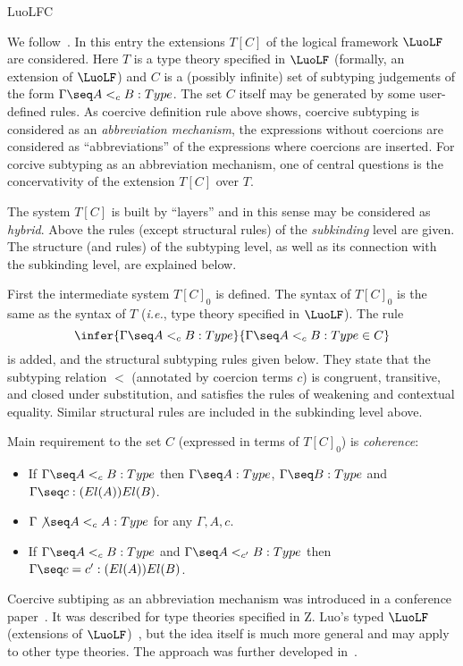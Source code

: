 \begin{entry}{LuoLFC}
	\begin{clarifications}
We follow~\cite{LuoSolXue:13}. In this entry the extensions $T[C]$ of the logical framework $\LuoLF$
are considered. Here $T$ is a type theory specified in $\LuoLF$ (formally, an extension
of $\LuoLF$) and
 $C$ is a (possibly infinite)
set of subtyping judgements of the form $\Gamma\seq A<_cB:Type$. 
The set $C$ itself
may be generated by some user-defined rules. As coercive definition rule
above shows, coercive subtyping is considered as an 
{\em abbreviation mechanism}, the expressions without coercions are 
considered as ``abbreviations'' of the expressions where coercions are 
inserted. For corcive subtyping as an abbreviation mechanism, one of central
questions is the concervativity of the extension $T[C]$ over $T$.

The system $T[C]$ is built by ``layers''
and in this sense may be considered as {\em hybrid}. Above the rules
(except structural rules) of the {\em subkinding} level are given. 
The structure (and rules)
of the subtyping level, as well as its connection with the 
subkinding level, are explained below. 

First the intermediate system $T[C]_0$ is defined. 
The syntax of $T[C]_0$ is the same
as the syntax of $T$ ({\em i.e.}, type theory specified in $\LuoLF$). The rule
 $$\infer{\Gamma\seq A<_cB:Type}{\Gamma\seq A<_cB:Type\in C}$$ is added, 
and the structural subtyping rules
given below.  They state that the subtyping relation $<$ (annotated
by coercion terms $c$) is congruent, transitive, and closed under
substitution, and satisfies the rules of weakening and contextual equality. Similar structural rules are included in the subkinding level above. 

Main requirement to the set $C$ (expressed in terms of $T[C]_0$) is {\em coherence}:
\begin{itemize}
\item If $\Gamma\seq A<_cB:Type$ then $\Gamma\seq A:Type$, $\Gamma\seq B:Type$ and $\Gamma\seq c: (El(A))El(B)$.
\item $\Gamma\not\seq A<_cA:Type$ for any $\Gamma, A, c$.
\item If $\Gamma\seq A<_c B:Type$ and $\Gamma\seq A<_{c'}B:Type$ then $\Gamma\seq c=c':(El(A))El(B)$.
\end{itemize}

\end{clarifications}

	\begin{history}
Coercive subtiping as an abbreviation mechanism
was introduced in a conference paper~\cite{Luo96:CSL}.  
It was described for type theories specified in Z. Luo's typed $\LuoLF$
(extensions of $\LuoLF$)~, but
the idea itself is much more general and may apply
to other type theories. The approach was further
developed in~\cite{jls:TYPES96, Luo:99, SolLuo:02, LuoSolXue:13}.


\end{history}
\end{entry}

